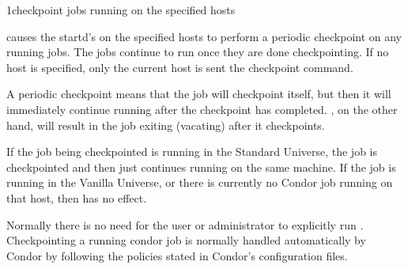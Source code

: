 \begin{ManPage}{}{1}{checkpoint jobs running on the specified hosts}
\label{man-condor-checkpoint}
\Synopsis {}

\Description
{} causes the startd's on the specified hosts to perform a periodic
checkpoint on any running jobs. The jobs continue to run once
they are done checkpointing. If no host is specified, only the current host is sent
the checkpoint command.

A periodic checkpoint means that the job will checkpoint itself, but then it will immediately continue running
after the checkpoint has completed. , on the other hand, will result in the job exiting (vacating) after it
checkpoints. 

If the job being checkpointed is running in the Standard Universe, the job is checkpointed and then just continues running
on the same machine. If the job is running in the Vanilla Universe, or there is currently no Condor job
running on that host, then  has no effect. 

Normally there is no need for the user or administrator to explicitly run . Checkpointing a running condor
job is normally handled automatically by Condor by following the policies stated in Condor's configuration files. 

\begin{Options}
\end{Options}

\end{ManPage}
